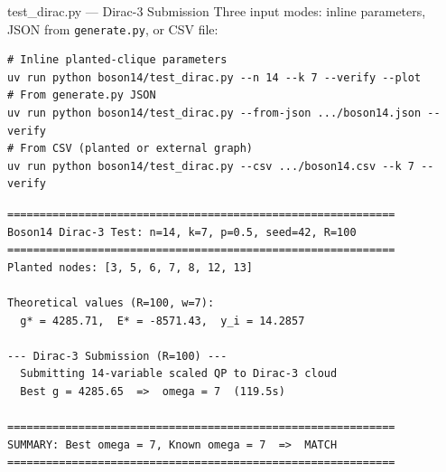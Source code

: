 \documentclass[aspectratio=169]{beamer}
\begin{document}
\begin{frame}[fragile]{test\_dirac.py --- Dirac-3 Submission}
    Three input modes: inline parameters, JSON from \texttt{generate.py}, or CSV file:
\begin{lstlisting}[style=shell,numbers=none]
# Inline planted-clique parameters
uv run python boson14/test_dirac.py --n 14 --k 7 --verify --plot
# From generate.py JSON
uv run python boson14/test_dirac.py --from-json .../boson14.json --verify
# From CSV (planted or external graph)
uv run python boson14/test_dirac.py --csv .../boson14.csv --k 7 --verify
\end{lstlisting}

\begin{lstlisting}[numbers=none,basicstyle=\ttfamily\scriptsize]
============================================================
Boson14 Dirac-3 Test: n=14, k=7, p=0.5, seed=42, R=100
============================================================
Planted nodes: [3, 5, 6, 7, 8, 12, 13]

Theoretical values (R=100, w=7):
  g* = 4285.71,  E* = -8571.43,  y_i = 14.2857

--- Dirac-3 Submission (R=100) ---
  Submitting 14-variable scaled QP to Dirac-3 cloud
  Best g = 4285.65  =>  omega = 7  (119.5s)

============================================================
SUMMARY: Best omega = 7, Known omega = 7  =>  MATCH
============================================================
\end{lstlisting}
\end{frame}

\end{document}
